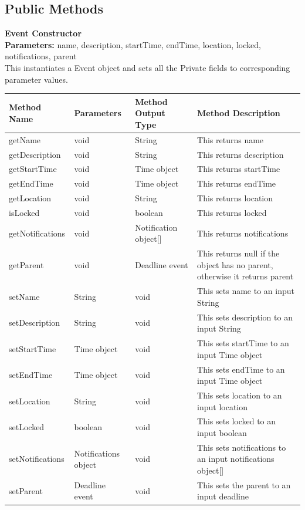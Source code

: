 \documentclass{scrreprt}
\begin{document}
\subsection{Public Methods}

\textbf{Event Constructor} \\
\textbf{Parameters:} name, description, startTime, endTime, location, locked, notifications, parent \\
This instantiates a Event object and sets all the Private fields to corresponding parameter values.

\begin{center}
\begin{longtable}{ | p{3cm} | p{3cm} | p{3cm} | p{5cm} | }
\hline
\textbf{Method Name} & \textbf {Parameters} & \textbf{Method Output Type} & \textbf{Method Description} \\
\hline
getName & void & String & This returns name \\
\hline
getDescription & void & String & This returns description \\
\hline
getStartTime & void & Time object & This returns startTime \\
\hline
getEndTime & void & Time object & This returns endTime \\
\hline
getLocation & void & String & This returns location \\
\hline
isLocked & void & boolean & This returns locked \\
\hline
getNotifications & void & Notification object[] & This returns notifications \\
\hline
getParent & void & Deadline event & This returns null if the object has no parent, otherwise it returns parent \\
\hline
setName & String & void & This sets name to an input String \\
\hline
setDescription & String & void & This sets description to an input String \\
\hline
setStartTime & Time object & void & This sets startTime to an input Time object \\
\hline
setEndTime & Time object & void & This sets endTime to an input Time object \\
\hline
setLocation & String & void & This sets location to an input location \\
\hline
setLocked & boolean & void & This sets locked to an input boolean \\
\hline
setNotifications & Notifications object & void & This sets notifications to an input notifications object[] \\
\hline
setParent & Deadline event & void & This sets the parent to an input deadline \\
\hline
\end{longtable}
\end{center}
\end{document}
